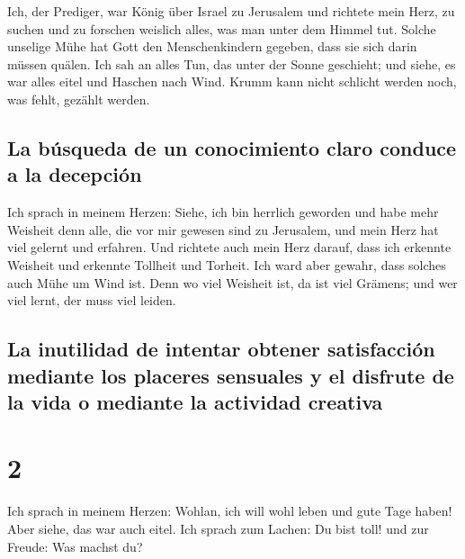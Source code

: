  Ich, der Prediger, war König über Israel zu Jerusalem
 und richtete mein Herz, zu suchen und zu forschen
weislich alles, was man unter dem Himmel tut. Solche unselige Mühe hat
Gott den Menschenkindern gegeben, dass sie sich darin müssen quälen.
 Ich sah an alles Tun, das unter der Sonne geschieht; und
siehe, es war alles eitel und Haschen nach Wind.  Krumm
kann nicht schlicht werden noch, was fehlt, gezählt werden.

\hypertarget{la-buxfasqueda-de-un-conocimiento-claro-conduce-a-la-decepciuxf3n}{%
\subsection{La búsqueda de un conocimiento claro conduce a la
decepción}\label{la-buxfasqueda-de-un-conocimiento-claro-conduce-a-la-decepciuxf3n}}

 Ich sprach in meinem Herzen: Siehe, ich bin herrlich
geworden und habe mehr Weisheit denn alle, die vor mir gewesen sind zu
Jerusalem, und mein Herz hat viel gelernt und erfahren. 
Und richtete auch mein Herz darauf, dass ich erkennte Weisheit und
erkennte Tollheit und Torheit. Ich ward aber gewahr, dass solches auch
Mühe um Wind ist.  Denn wo viel Weisheit ist, da ist viel
Grämens; und wer viel lernt, der muss viel leiden.

\hypertarget{la-inutilidad-de-intentar-obtener-satisfacciuxf3n-mediante-los-placeres-sensuales-y-el-disfrute-de-la-vida-o-mediante-la-actividad-creativa}{%
\subsection{La inutilidad de intentar obtener satisfacción mediante los
placeres sensuales y el disfrute de la vida o mediante la actividad
creativa}\label{la-inutilidad-de-intentar-obtener-satisfacciuxf3n-mediante-los-placeres-sensuales-y-el-disfrute-de-la-vida-o-mediante-la-actividad-creativa}}

\hypertarget{section-1}{%
\section{2}\label{section-1}}

 Ich sprach in meinem Herzen: Wohlan, ich will wohl leben
und gute Tage haben! Aber siehe, das war auch eitel.  Ich
sprach zum Lachen: Du bist toll! und zur Freude: Was machst du?

